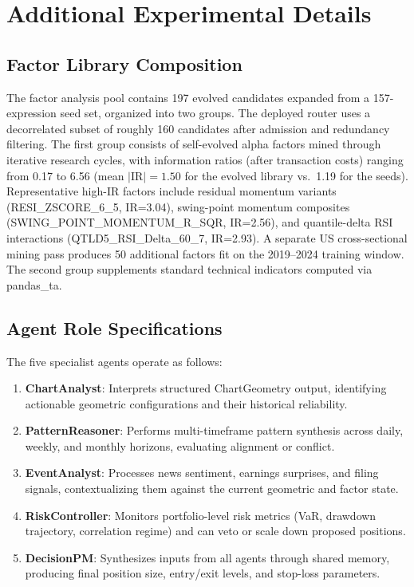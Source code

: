 \section{Additional Experimental Details}
\label{sec:appendix_details}

\subsection{Factor Library Composition}
The factor analysis pool contains 197 evolved candidates expanded from a 157-expression seed set, organized into two groups. The deployed router uses a decorrelated subset of roughly 160 candidates after admission and redundancy filtering. The first group consists of self-evolved alpha factors mined through iterative research cycles, with information ratios (after transaction costs) ranging from 0.17 to 6.56 (mean $|\mathrm{IR}|{=}1.50$ for the evolved library vs.\ 1.19 for the seeds). Representative high-IR factors include residual momentum variants (RESI\_ZSCORE\_6\_5, IR=3.04), swing-point momentum composites (SWING\_POINT\_MOMENTUM\_R\_SQR, IR=2.56), and quantile-delta RSI interactions (QTLD5\_RSI\_Delta\_60\_7, IR=2.93). A separate US cross-sectional mining pass produces 50 additional factors fit on the 2019--2024 training window. The second group supplements standard technical indicators computed via pandas\_ta.

\subsection{Agent Role Specifications}

The five specialist agents operate as follows:
\begin{enumerate}
    \item \textbf{ChartAnalyst}: Interprets structured ChartGeometry output, identifying actionable geometric configurations and their historical reliability.
    \item \textbf{PatternReasoner}: Performs multi-timeframe pattern synthesis across daily, weekly, and monthly horizons, evaluating alignment or conflict.
    \item \textbf{EventAnalyst}: Processes news sentiment, earnings surprises, and filing signals, contextualizing them against the current geometric and factor state.
    \item \textbf{RiskController}: Monitors portfolio-level risk metrics (VaR, drawdown trajectory, correlation regime) and can veto or scale down proposed positions.
    \item \textbf{DecisionPM}: Synthesizes inputs from all agents through shared memory, producing final position size, entry/exit levels, and stop-loss parameters.
\end{enumerate}

